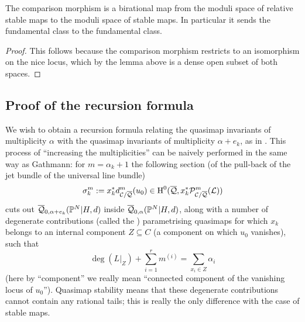 \begin{cor} \label{Comparison morphism birational} The comparison morphism is a birational map from the moduli space of relative stable maps to the moduli space of stable maps. In particular it sends the fundamental class to the fundamental class. \end{cor}
\begin{proof} This follows because the comparison morphism restricts to an isomorphism on the nice locus, which by the lemma above is a dense open subset of both spaces. \end{proof}


\subsection{Proof of the recursion formula} \label{Subsection recursion formula for PN}
We wish to obtain a recursion formula relating the quasimap invariants of multiplicity $\alpha$ with the quasimap invariants of multiplicity $\alpha + e_k$, as in \cite[Theorem 2.6]{Ga}. This process of ``increasing the multiplicities'' can be naively performed in the same way as Gathmann: for $m = \alpha_k + 1$ the following section (of the pull-back of the jet bundle of the universal line bundle)
\[
\sigma^m_k:=x_k^*d^m_{\mathcal C/\overline{\mathcal Q}}(u_0)\in \operatorname{H}^0(\overline{\mathcal Q},x_k^*\mathcal P^m_{\mathcal C/\overline{\mathcal Q}}(\mathcal L))
\]
cuts out $\overline{\mathcal Q}_{0,\alpha+e_k}(\mathbb P^N|H,d)$ inside $\overline{\mathcal Q}_{0,\alpha}(\mathbb P^N|H,d)$, along with a number of degenerate contributions (called the ) parametrising quasimaps for which $x_k$ belongs to an internal component $Z \subseteq C$ (a component on which $u_0$ vanishes), such that
\begin{equation*}\deg(L|_{Z})+\sum_{i=1}^r m^{(i)}=\sum_{x_i\in Z}\alpha_i \end{equation*}
(here by ``component'' we really mean ``connected component of the vanishing locus of $u_0$''). Quasimap stability means that these degenerate contributions cannot contain any rational tails; this is really the only difference with the case of stable maps.


